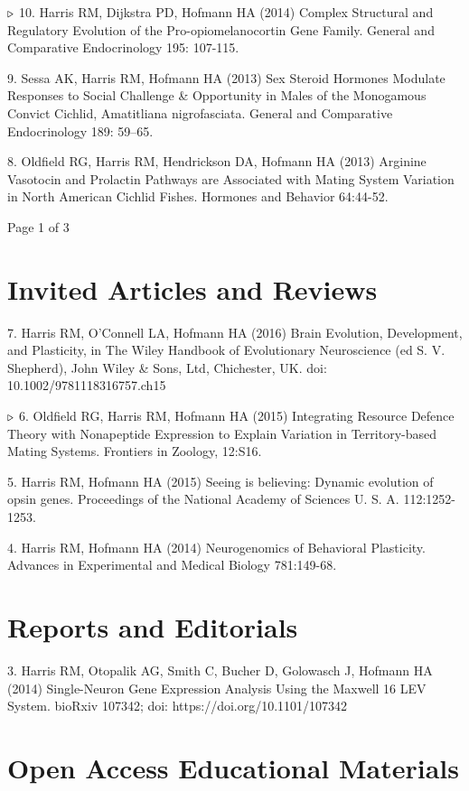 \documentclass[margin,line]{resume}
\begin{document}
\begin{resume}
{\color{red} ${\bf \triangleright}$}
10. Harris RM, Dijkstra PD, Hofmann HA (2014) Complex Structural and Regulatory Evolution of the Pro-opiomelanocortin Gene Family. General and Comparative Endocrinology 195: 107-115. 

9. Sessa AK, Harris RM, Hofmann HA (2013) Sex Steroid Hormones Modulate Responses to Social Challenge \& Opportunity in Males of the Monogamous Convict Cichlid, Amatitliana nigrofasciata. General and Comparative Endocrinology 189: 59–65. 

8. Oldfield RG, Harris RM, Hendrickson DA, Hofmann HA (2013) Arginine Vasotocin and Prolactin Pathways are Associated with Mating System Variation in North American Cichlid Fishes. Hormones and Behavior 64:44-52. 

\vspace{2mm}
{\centerline {Page 1 of 3}}
\newpage

\section{\mysidestyle Invited Articles and Reviews}

7. Harris RM, O’Connell LA, Hofmann HA (2016) Brain Evolution, Development, and Plasticity, in The Wiley Handbook of Evolutionary Neuroscience (ed S. V. Shepherd), John Wiley \& Sons, Ltd, Chichester, UK. doi: 10.1002/9781118316757.ch15

{\color{red} ${\bf \triangleright}$}
6. 	Oldfield RG, Harris RM, Hofmann HA (2015) Integrating Resource Defence Theory with Nonapeptide Expression to Explain Variation in Territory-based Mating Systems. Frontiers in Zoology, 12:S16. 

5.	Harris RM, Hofmann HA (2015) Seeing is believing: Dynamic evolution of opsin genes. Proceedings of the National Academy of Sciences U. S. A. 112:1252-1253. 

4. 	Harris RM, Hofmann HA (2014) Neurogenomics of Behavioral Plasticity. Advances in Experimental and Medical Biology 781:149-68. 

\section{\mysidestyle Reports and Editorials}

3. Harris RM, Otopalik AG, Smith C, Bucher D, Golowasch J, Hofmann HA (2014) Single-Neuron Gene Expression Analysis Using the Maxwell 16 LEV System. bioRxiv 107342; doi: https://doi.org/10.1101/107342

\section{\mysidestyle Open Access Educational Materials}


\end{resume}
\end{document}
